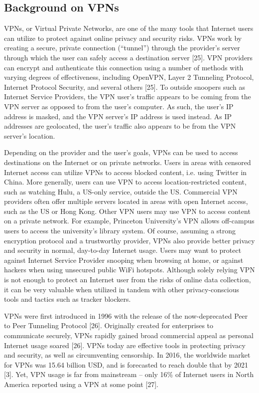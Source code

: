 \subsection{Background on VPNs}
VPNs, or Virtual Private Networks, are one of the many tools that Internet users can utilize to protect against online privacy and security risks. VPNs work by creating a secure, private connection (“tunnel”) through the provider’s server through which the user can safely access a destination server [25]. VPN providers can encrypt and authenticate this connection using a number of methods with varying degrees of effectiveness, including OpenVPN, Layer 2 Tunneling Protocol, Internet Protocol Security, and several others [25]. To outside snoopers such as Internet Service Providers, the VPN user’s traffic appears to be coming from the VPN server as opposed to from the user’s computer. As such, the user’s IP address is masked, and the VPN server’s IP address is used instead. As IP addresses are geolocated, the user’s traffic also appears to be from the VPN server’s location.

Depending on the provider and the user’s goals, VPNs can be used to access destinations on the Internet or on private networks. Users in areas with censored Internet access can utilize VPNs to access blocked content, i.e. using Twitter in China. More generally, users can use VPN to access location-restricted content, such as watching Hulu, a US-only service, outside the US. Commercial VPN providers often offer multiple servers located in areas with open Internet access, such as the US or Hong Kong. Other VPN users may use VPN to access content on a private network. For example, Princeton University’s VPN allows off-campus users to access the university’s library system. Of course, assuming a strong encryption protocol and a trustworthy provider, VPNs also provide better privacy and security in normal, day-to-day Internet usage. Users may want to protect against Internet Service Provider snooping when browsing at home, or against hackers when using unsecured public WiFi hotspots. Although solely relying VPN is not enough to protect an Internet user from the risks of online data collection, it can be very valuable when utilized in tandem with other privacy-conscious tools and tactics such as tracker blockers.

VPNs were first introduced in 1996 with the release of the now-deprecated Peer to Peer Tunneling Protocol [26]. Originally created for enterprises to communicate securely, VPNs rapidly gained broad commercial appeal as personal Internet usage soared [26]. VPNs today are effective tools in protecting privacy and security, as well as circumventing censorship. In 2016, the worldwide market for VPNs was 15.64 billion USD, and is forecasted to reach double that by 2021 [3]. Yet, VPN usage is far from mainstream -- only 16\% of Internet users in North America reported using a VPN at some point [27].
